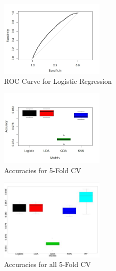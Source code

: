 \documentclass[10pt,twocolumn,letterpaper]{article}
\begin{document}

\begin{figure}
	\includegraphics[width=0.45\textwidth]{images/ROC}
	\caption{ROC Curve for Logistic Regression}
	\label{fig:ROC}
\end{figure}


\begin{figure}
	\includegraphics[width=0.45\textwidth]{images/5Fold.jpeg}
	\caption{Accuracies for 5-Fold CV}
	\label{fig:5f}
\end{figure}

\begin{figure}
	\includegraphics[width=0.45\textwidth]{images/RF.jpg}
	\caption{Accuracies for all 5-Fold CV}
	\label{fig:RF}
\end{figure}
\end{document}
